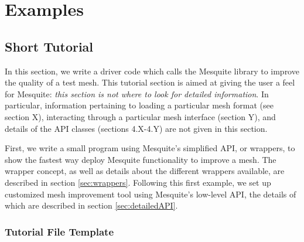 \chapter{Examples} \label{sec:examples}

\section{Short Tutorial}

In this section, we write a driver code which calls the Mesquite
library to improve the quality of a test mesh. This tutorial section
is aimed at giving the user a feel for Mesquite: \emph{this section is not
where to look for detailed information}. In particular, information
pertaining to loading a particular mesh format (see section X), 
interacting through a particular mesh interface (section Y), 
and details of the API classes (sections 4.X-4.Y) are not
given in this section.

First, we write a small program using Mesquite's simplified API, or
wrappers, to show the fastest way deploy Mesquite functionality to
improve a mesh.  The wrapper concept, as well as details about the
different wrappers available, are described in section
\ref{sec:wrappers}.  Following this first example, we set up customized mesh
improvement tool using Mesquite's low-level API, the details of which
are described in section \ref{sec:detailedAPI}.

\subsection{Tutorial File Template}
\label{sec:tutfile}


